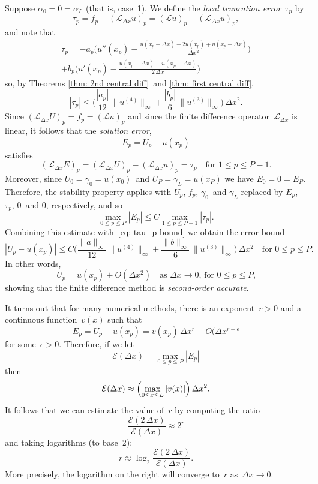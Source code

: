 Suppose $\alpha_0=0=\alpha_L$ (that is, case~1). We define the 
\emph{local truncation error}~$\tau_p$ by
\[
\tau_p=f_p-(\mathcal{L}_{\Delta x}u)_p
    =(\mathcal{L}u)_p-(\mathcal{L}_{\Delta x}u)_p,
\]
and note that
\begin{multline*}
\tau_p=-a_p\biggl(
    u''(x_p)-\frac{u(x_p+\Delta x)-2u(x_p)+u(x_p-\Delta x)}{\Delta x^2}\biggr)\\
+b_p\biggl(u'(x_p)-\frac{u(x_p+\Delta x)-u(x_p-\Delta x)}{2\,\Delta x}\biggr)
\end{multline*}
so, by Theorems \ref{thm: 2nd central diff}~and \ref{thm: first central diff},
\begin{equation}\label{eq: tau_p bound}
|\tau_p|\le\biggl(\frac{|a_p|}{12}\,\|u^{(4)}\|_\infty
    +\frac{|b_p|}{6}\,\|u^{(3)}\|_\infty\biggr)\,\Delta x^2.
\end{equation}
Since $(\mathcal{L}_{\Delta x}U)_p=f_p=(\mathcal{L}u)_p$ and since the 
finite difference operator~$\mathcal{L}_{\Delta x}$ is linear, it follows that
the \emph{solution error},
\[
E_p=U_p-u(x_p)
\]
satisfies
\[
(\mathcal{L}_{\Delta x}E)_p=(\mathcal{L}_{\Delta x}U)_p
    -(\mathcal{L}_{\Delta x}u)_p=\tau_p\quad\text{for $1\le p\le P-1$.}
\]
Moreover, since $U_0=\gamma_0=u(x_0)$~and $U_P=\gamma_L=u(x_P)$ we have 
$E_0=0=E_P$.  Therefore, the stability property applies with $U_p$, $f_p$, 
$\gamma_0$~and $\gamma_L$ replaced by $E_p$, $\tau_p$, $0$~and $0$, 
respectively, and so
\[
\max_{0\le p\le P}|E_p|\le C\max_{1\le p\le P-1}|\tau_p|.
\]
Combining this estimate with~\eqref{eq: tau_p bound} we obtain the error bound
\[
|U_p-u(x_p)|\le C \biggl(\frac{\|a\|_\infty}{12}\,\|u^{(4)}\|_\infty
    +\frac{\|b\|_\infty}{6}\,\|u^{(3)}\|_\infty\biggr)\,\Delta x^2
    \quad\text{for $0\le p\le P$.}
\]
In other words,
\[
U_p=u(x_p)+O(\Delta x^2)\quad\text{as $\Delta x\to0$, for $0\le p\le P$,}
\]
showing that the finite difference method is \emph{second-order accurate}.

It turns out that for many numerical methods, there is an exponent~$r>0$ and a 
continuous function~$v(x)$ such that
\[
E_p=U_p-u(x_p)=v(x_p)\,\Delta x^r+O(\Delta x^{r+\epsilon}
\]
for some~$\epsilon>0$.  Therefore, if we let
\[
\mathcal{E}(\Delta x)=\max_{0\le p\le P}|E_p|
\]
then
\[
\mathcal{E}(\Delta x)\approx\Bigl(\max_{0\le x\le L}|v(x)|\Bigr)\,\Delta x^2.
\]
It follows that we can estimate the value of~$r$ by computing the ratio
\[
\frac{\mathcal{E}(2\,\Delta x)}{\mathcal{E}(\Delta x)}\approx 2^r
\]
and taking logarithms (to base~2):
\[
r\approx\log_2\frac{\mathcal{E}(2\,\Delta x)}{\mathcal{E}(\Delta x)}.
\]
More precisely, the logarithm on the right will converge to~$r$ 
as~$\Delta x\to0$.

